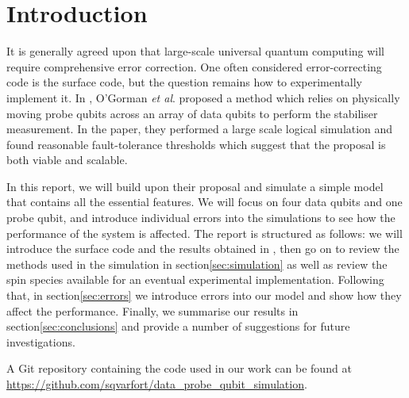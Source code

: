 \section{Introduction} \label{sec:introduction}

It is generally agreed upon that large-scale universal quantum computing will require comprehensive error correction. One often considered error-correcting code is the surface code, but the question remains how to experimentally implement it. In \cite{OGorman2016}, O'Gorman \textit{et al}. proposed a method which relies on physically moving probe qubits across an array of data qubits to perform the stabiliser measurement. In the paper, they performed a large scale logical simulation and found reasonable fault-tolerance thresholds which suggest that the proposal is both viable and scalable. 

In this report, we will build upon their proposal and simulate a simple model that contains all the essential features. We will focus on four data qubits and one probe qubit, and introduce individual errors into the simulations to see how the performance of the system is affected. The report is structured as follows: we will introduce the surface code and the results obtained in \citet{OGorman2016}, then go on to review the methods used in the simulation in section\@ \ref{sec:simulation} as well as review the spin species available for an eventual experimental implementation. Following that, in section\@ \ref{sec:errors} we introduce errors into our model and show how they affect the performance. Finally, we summarise our results in section\@ \ref{sec:conclusions} and provide a number of suggestions for future investigations. 

A Git repository containing the code used in our work can be found at \url{https://github.com/sqvarfort/data_probe_qubit_simulation}. 

